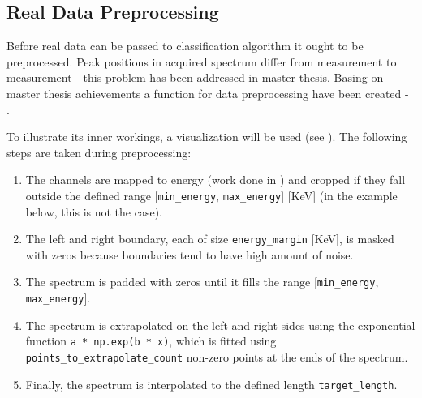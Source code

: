 \subsection{Real Data Preprocessing}
\label{sec:data-preprocessing}
Before real data can be passed to classification algorithm it ought to be preprocessed. 
Peak positions in acquired spectrum differ from measurement to measurement - this problem has been addressed in \cite{Goral2023} master thesis.
Basing on master thesis achievements a function for data preprocessing have been created - .

\newenvironment{longlistingF}{\captionsetup{type=listing, width=0.8\textwidth}}{}
\begin{longlistingF}
    \caption{}
    \label{lst:data_preprocessing}
\end{longlistingF}
\vspace{12pt}

To illustrate its inner workings, a visualization will be used (see ). The following steps are taken during preprocessing:
\begin{enumerate}
    \item The channels are mapped to energy (work done in \cite{Goral2023}) and cropped if they fall outside the defined range [\texttt{min\_energy}, \texttt{max\_energy}] [KeV] (in the example below, this is not the case).
    \item The left and right boundary, each of size \texttt{energy\_margin} [KeV], is masked with zeros because boundaries tend to have high amount of noise.
    \item The spectrum is padded with zeros until it fills the range [\texttt{min\_energy}, \texttt{max\_energy}].
    \item The spectrum is extrapolated on the left and right sides using the exponential function \texttt{a * np.exp(b * x)}, which is fitted using \texttt{points\_to\_extrapolate\_count} non-zero points at the ends of the spectrum.
    \item Finally, the spectrum is interpolated to the defined length \texttt{target\_length}.
\end{enumerate}

